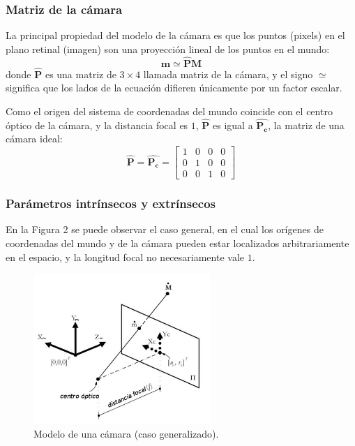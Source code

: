 \documentclass[11pt,a4paper,titlepage]{article}
\newcommand{\Two}[1]{\ensuremath{\mathbf{#1}}}
\newcommand{\Three}[1]{\ensuremath{\mathbf{#1}}}
\newcommand{\Mat}[1]{\ensuremath{\mathbf{\hat{#1}}}}
\newcommand{\Figure}[1]{Figura #1}
\begin{document}
\subsubsection{Matriz de la cámara}

La principal propiedad del modelo de la cámara es que los puntos (pixels) en el plano retinal (imagen) son una proyección lineal de los puntos en el mundo:
\[
	\Two{m} \simeq \Mat{P}\Three{M}
\]
donde \Mat{P} es una matriz de $3 \times 4$ llamada matriz de la cámara, y el signo $\simeq$ significa que los lados de la ecuación difieren únicamente por un factor escalar.

Como el origen del sistema de coordenadas del mundo coincide con el centro óptico de la cámara, y la distancia focal es $1$, \Mat{P} es igual a $\Mat{P_c}$, la matriz de una cámara ideal:
\[
	\Mat{P} = \Mat{P_c} =
	\begin{bmatrix}
		1 & 0 & 0 & 0 \\
		0 & 1 & 0 & 0 \\
		0 & 0 & 1 & 0
	\end{bmatrix}
\]

\subsubsection{Parámetros intrínsecos y extrínsecos}

En la \Figure{2} se puede observar el caso general, en el cual los orígenes de coordenadas del mundo y de la cámara pueden estar localizados arbitrariamente en el espacio, y la longitud focal no necesariamente vale $1$.


\begin{figure}[h!]

  \centering
    \includegraphics[width=0.6\textwidth]{f2.png}
  \caption{Modelo de una cámara (caso generalizado).}
\end{figure}
\end{document}
